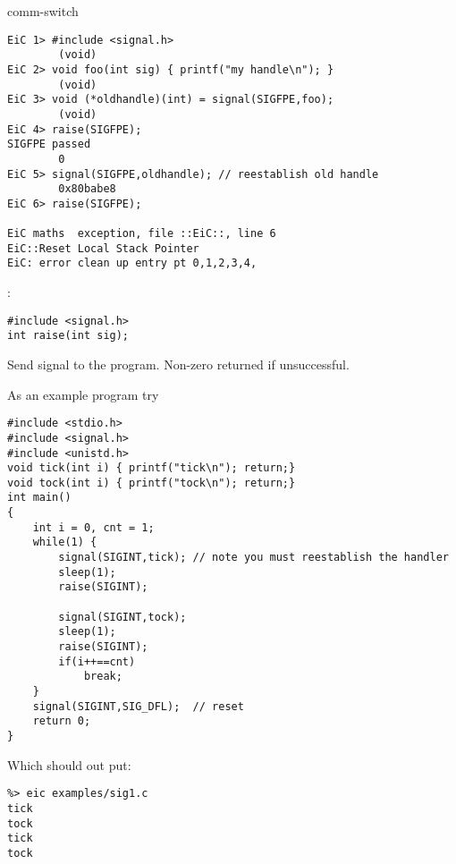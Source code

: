 \begin{Ventry2}{comm-switch  }
\begin{production}
\begin{verbatim}
EiC 1> #include <signal.h>
        (void)
EiC 2> void foo(int sig) { printf("my handle\n"); }
        (void)
EiC 3> void (*oldhandle)(int) = signal(SIGFPE,foo);
        (void)
EiC 4> raise(SIGFPE);
SIGFPE passed
        0
EiC 5> signal(SIGFPE,oldhandle); // reestablish old handle
        0x80babe8
EiC 6> raise(SIGFPE);           

EiC maths  exception, file ::EiC::, line 6
EiC::Reset Local Stack Pointer
EiC: error clean up entry pt 0,1,2,3,4,
\end{verbatim}
\end{production}

\item[raise]
\label{item:raise}
:
\begin{production}
\begin{verbatim}
#include <signal.h>
int raise(int sig);
\end{verbatim}
\end{production}

     Send signal  to the program. Non-zero returned if unsuccessful. 


As an example program try 

\begin{production}
\begin{verbatim}
#include <stdio.h>
#include <signal.h>
#include <unistd.h>
void tick(int i) { printf("tick\n"); return;}
void tock(int i) { printf("tock\n"); return;}
int main()
{
    int i = 0, cnt = 1;
    while(1) {
        signal(SIGINT,tick); // note you must reestablish the handler 
        sleep(1);
        raise(SIGINT);
        
        signal(SIGINT,tock);  
        sleep(1); 
        raise(SIGINT);
        if(i++==cnt) 
            break;         
    }
    signal(SIGINT,SIG_DFL);  // reset 
    return 0;                               
}
\end{verbatim}
\end{production}

Which should out put:
\begin{production}
\begin{verbatim}
%> eic examples/sig1.c
tick
tock
tick
tock
\end{verbatim}
\end{production}

\end{Ventry2}




